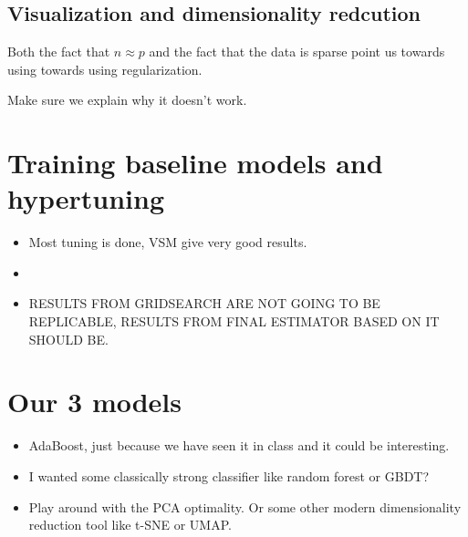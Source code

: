 \documentclass{article}
\begin{document}
\subsection{Visualization and dimensionality redcution}

Both the fact that $n \approx p$ and the fact that the data is sparse point us towards using towards using regularization.

Make sure we explain why it doesn't work.

\section{Training baseline models and hypertuning}

\begin{itemize}
    \item Most tuning is done, VSM give very good results.
    \item 
    \item RESULTS FROM GRIDSEARCH ARE NOT GOING TO BE REPLICABLE, RESULTS FROM FINAL ESTIMATOR BASED ON IT SHOULD BE.
\end{itemize}


\section{Our 3 models}

\begin{itemize}
    \item AdaBoost, just because we have seen it in class and it could be interesting.
    \item I wanted some classically strong classifier like random forest or GBDT?
    \item Play around with the PCA optimality. Or some other modern dimensionality reduction tool like t-SNE or UMAP. 
\end{itemize}

\section{}
\end{document}
